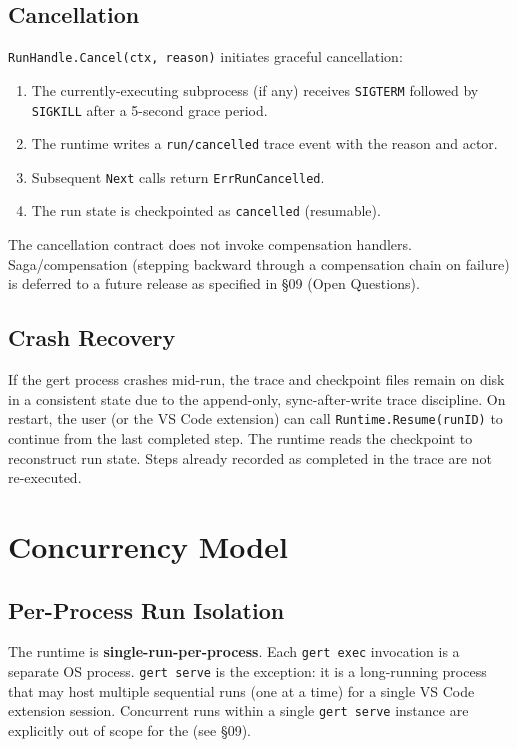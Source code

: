 \subsection{Cancellation}

\texttt{RunHandle.Cancel(ctx, reason)} initiates graceful cancellation:
\begin{enumerate}
  \item The currently-executing subprocess (if any) receives \texttt{SIGTERM} followed by
        \texttt{SIGKILL} after a 5-second grace period.
  \item The runtime writes a \texttt{run/cancelled} trace event with the reason and actor.
  \item Subsequent \texttt{Next} calls return \texttt{ErrRunCancelled}.
  \item The run state is checkpointed as \texttt{cancelled} (resumable).
\end{enumerate}

The cancellation contract does not invoke compensation handlers. Saga/compensation
(stepping backward through a compensation chain on failure) is deferred to a future release as specified
in §09 (Open Questions).

\subsection{Crash Recovery}

If the gert process crashes mid-run, the trace and checkpoint files remain on disk in a
consistent state due to the append-only, sync-after-write trace discipline. On restart,
the user (or the VS Code extension) can call \texttt{Runtime.Resume(runID)} to continue
from the last completed step. The runtime reads the checkpoint to reconstruct run state.
Steps already recorded as completed in the trace are not re-executed.

\section{Concurrency Model}

\subsection{Per-Process Run Isolation}

The runtime is \textbf{single-run-per-process}. Each \texttt{gert exec} invocation is a
separate OS process. \texttt{gert serve} is the exception: it is a long-running process that
may host multiple sequential runs (one at a time) for a single VS Code extension session.
Concurrent runs within a single \texttt{gert serve} instance are explicitly out of scope
for the (see §09).

